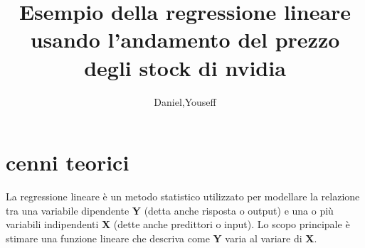 \documentclass[12pt]{article}
\author{Daniel,Youseff}
\title{Esempio della regressione lineare usando l'andamento del prezzo degli stock di nvidia}
\begin{document}
\maketitle
\section{cenni teorici}
La regressione lineare è un metodo statistico utilizzato per modellare la relazione tra una variabile dipendente
\textbf{Y} (detta anche risposta o output) e una o più variabili indipendenti 
\textbf{X} (dette anche predittori o input). Lo scopo principale è stimare una funzione lineare che descriva come \textbf{Y} 
varia al variare di \textbf{X}.
\end{document}
